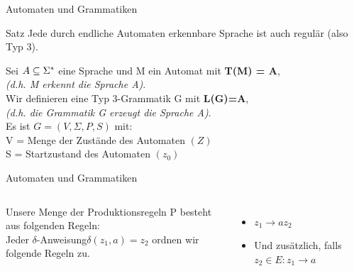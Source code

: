 \documentclass[10pt]{beamer}
\begin{document}
\begin{frame}[fragile]{Automaten und Grammatiken}
    \begin{exampleblock}{Satz}
    Jede durch endliche Automaten erkennbare Sprache ist auch regulär (also Typ 3).
    \end{exampleblock}
   Sei \alert{$A \subseteq \Sigma^{*}$} eine Sprache und \alert{M ein Automat mit \textbf{T(M) = A}},\\ \emph{(d.h. M erkennt die Sprache A)}.\\
   \vspace{0.3cm}
   Wir definieren eine \alert{Typ 3-Grammatik G mit \textbf{L(G)=A}},\\ \emph{(d.h. die Grammatik G erzeugt die Sprache A)}.\\
   \vspace{0.3cm}
   Es ist $G=(V, \Sigma, P, S)$ mit:\\
   V = Menge der Zustände des Automaten $(Z)$\\
   S = Startzustand des Automaten $(z_0)$\\
    \vspace{0.3cm}
\end{frame}

\begin{frame}[fragile]{Automaten und Grammatiken}
    \begin{columns}
        Unsere Menge der Produktionsregeln P besteht aus folgenden Regeln:\\
        \vspace{0.3cm}
        Jeder \dq $\delta$-Anweisung\dq \alert{$\delta(z_1, a)=z_2$} ordnen wir folgende Regeln zu.
        \begin{itemize}
            \item \alert<2>{$z_1 \rightarrow a z_2$}
            \item Und zusätzlich, falls \alert<3>{$z_2 \in E: z_1 \rightarrow a$}
        \end{itemize}
        \centering
            
    \end{columns}
\end{frame}
\end{document}
